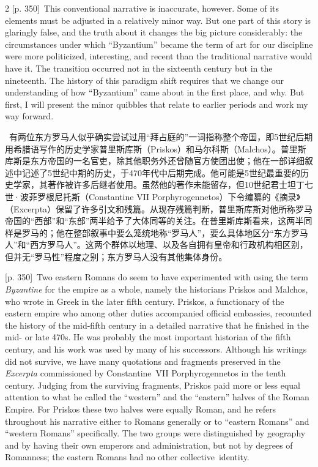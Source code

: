\documentclass[10pt,a4paper]{article}
\begin{document}
\begin{paracol}{2}
\switchcolumn
{\scriptsize\color{gray}[p. 350]}\ This conventional narrative is inaccurate, however. Some of its elements must be adjusted in a relatively minor way. But one part of this story is glaringly false, and the truth about it changes the big picture considerably: the circumstances under which “Byzantium” became the term of art for our discipline were more politicized, interesting, and recent than the traditional narrative would have it. The transition occurred not in the sixteenth century but in the nineteenth. The history of this paradigm shift requires that we change our understanding of how “Byzantium” came about in the first place, and why. But first, I will present the minor quibbles that relate to earlier periods and work my way forward.\par
\switchcolumn*
{\scriptsize\color{gray}[p. 350]}\ 有两位东方罗马人似乎确实尝试过用“拜占庭的”一词指称整个帝国，即5世纪后期用希腊语写作的历史学家普里斯库斯（Priskos）和马尔科斯（Malchos）。普里斯库斯是东方帝国的一名官吏，除其他职务外还曾随官方使团出使；他在一部详细叙述中记述了5世纪中期的历史，于470年代中后期完成。他可能是5世纪最重要的历史学家，其著作被许多后继者使用。虽然他的著作未能留存，但10世纪君士坦丁七世·波菲罗根尼托斯（Constantine VII Porphyrogennetos）下令编纂的《摘录》（Excerpta）保留了许多引文和残篇。从现存残篇判断，普里斯库斯对他所称罗马帝国的“西部”和“东部”两半给予了大体同等的关注。在普里斯库斯看来，这两半同样是罗马的；他在整部叙事中要么笼统地称“罗马人”，要么具体地区分“东方罗马人”和“西方罗马人”。这两个群体以地理、以及各自拥有皇帝和行政机构相区别，但并无“罗马性”程度之别；东方罗马人没有其他集体身份。\par
\switchcolumn
{\scriptsize\color{gray}[p. 350]}\ Two eastern Romans do seem to have experimented with using the term \textit{Byzantine} for the empire as a whole, namely the historians Priskos and Malchos, who wrote in Greek in the later fifth century. Priskos, a functionary of the eastern empire who among other duties accompanied official embassies, recounted the history of the mid-fifth century in a detailed narrative that he finished in the mid- or late 470s. He was probably the most important historian of the fifth century, and his work was used by many of his successors. Although his writings did not survive, we have many quotations and fragments preserved in the \textit{Excerpta} commissioned by Constantine VII Porphyrogennetos in the tenth century. Judging from the surviving fragments, Priskos paid more or less equal attention to what he called the “western” and the “eastern” halves of the Roman Empire. For Priskos these two halves were equally Roman, and he refers throughout his narrative either to Romans generally or to “eastern Romans” and “western Romans” specifically. The two groups were distinguished by geography and by having their own emperors and administration, but not by degrees of Romanness; the eastern Romans had no other collective identity.\par

\end{paracol}
\end{document}
